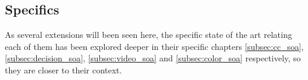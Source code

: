 \subsection{Specifics}
As several extensions will been seen here, the specific state of the art relating each of them has been explored deeper in their specific chapters \ref{subsec:cc_soa}, \ref{subsec:decision_soa}, \ref{subsec:video_soa} and \ref{subsec:color_soa} respectively, so they are closer to their context.
